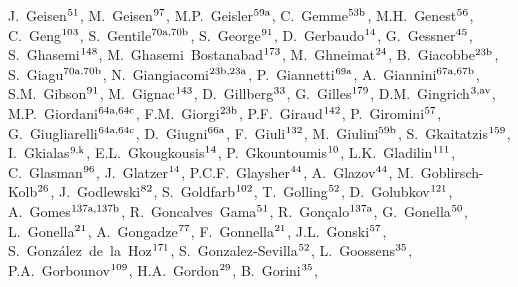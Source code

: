 \begin{flushleft}
J.~Geisen$^\textrm{\scriptsize 51}$,    
M.~Geisen$^\textrm{\scriptsize 97}$,    
M.P.~Geisler$^\textrm{\scriptsize 59a}$,    
C.~Gemme$^\textrm{\scriptsize 53b}$,    
M.H.~Genest$^\textrm{\scriptsize 56}$,    
C.~Geng$^\textrm{\scriptsize 103}$,    
S.~Gentile$^\textrm{\scriptsize 70a,70b}$,    
S.~George$^\textrm{\scriptsize 91}$,    
D.~Gerbaudo$^\textrm{\scriptsize 14}$,    
G.~Gessner$^\textrm{\scriptsize 45}$,    
S.~Ghasemi$^\textrm{\scriptsize 148}$,    
M.~Ghasemi~Bostanabad$^\textrm{\scriptsize 173}$,    
M.~Ghneimat$^\textrm{\scriptsize 24}$,    
B.~Giacobbe$^\textrm{\scriptsize 23b}$,    
S.~Giagu$^\textrm{\scriptsize 70a,70b}$,    
N.~Giangiacomi$^\textrm{\scriptsize 23b,23a}$,    
P.~Giannetti$^\textrm{\scriptsize 69a}$,    
A.~Giannini$^\textrm{\scriptsize 67a,67b}$,    
S.M.~Gibson$^\textrm{\scriptsize 91}$,    
M.~Gignac$^\textrm{\scriptsize 143}$,    
D.~Gillberg$^\textrm{\scriptsize 33}$,    
G.~Gilles$^\textrm{\scriptsize 179}$,    
D.M.~Gingrich$^\textrm{\scriptsize 3,av}$,    
M.P.~Giordani$^\textrm{\scriptsize 64a,64c}$,    
F.M.~Giorgi$^\textrm{\scriptsize 23b}$,    
P.F.~Giraud$^\textrm{\scriptsize 142}$,    
P.~Giromini$^\textrm{\scriptsize 57}$,    
G.~Giugliarelli$^\textrm{\scriptsize 64a,64c}$,    
D.~Giugni$^\textrm{\scriptsize 66a}$,    
F.~Giuli$^\textrm{\scriptsize 132}$,    
M.~Giulini$^\textrm{\scriptsize 59b}$,    
S.~Gkaitatzis$^\textrm{\scriptsize 159}$,    
I.~Gkialas$^\textrm{\scriptsize 9,k}$,    
E.L.~Gkougkousis$^\textrm{\scriptsize 14}$,    
P.~Gkountoumis$^\textrm{\scriptsize 10}$,    
L.K.~Gladilin$^\textrm{\scriptsize 111}$,    
C.~Glasman$^\textrm{\scriptsize 96}$,    
J.~Glatzer$^\textrm{\scriptsize 14}$,    
P.C.F.~Glaysher$^\textrm{\scriptsize 44}$,    
A.~Glazov$^\textrm{\scriptsize 44}$,    
M.~Goblirsch-Kolb$^\textrm{\scriptsize 26}$,    
J.~Godlewski$^\textrm{\scriptsize 82}$,    
S.~Goldfarb$^\textrm{\scriptsize 102}$,    
T.~Golling$^\textrm{\scriptsize 52}$,    
D.~Golubkov$^\textrm{\scriptsize 121}$,    
A.~Gomes$^\textrm{\scriptsize 137a,137b}$,    
R.~Goncalves~Gama$^\textrm{\scriptsize 51}$,    
R.~Gon\c{c}alo$^\textrm{\scriptsize 137a}$,    
G.~Gonella$^\textrm{\scriptsize 50}$,    
L.~Gonella$^\textrm{\scriptsize 21}$,    
A.~Gongadze$^\textrm{\scriptsize 77}$,    
F.~Gonnella$^\textrm{\scriptsize 21}$,    
J.L.~Gonski$^\textrm{\scriptsize 57}$,    
S.~Gonz\'alez~de~la~Hoz$^\textrm{\scriptsize 171}$,    
S.~Gonzalez-Sevilla$^\textrm{\scriptsize 52}$,    
L.~Goossens$^\textrm{\scriptsize 35}$,    
P.A.~Gorbounov$^\textrm{\scriptsize 109}$,    
H.A.~Gordon$^\textrm{\scriptsize 29}$,    
B.~Gorini$^\textrm{\scriptsize 35}$,    

\end{flushleft}
